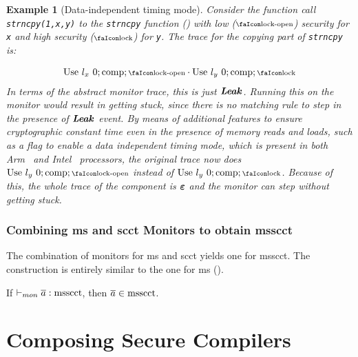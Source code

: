 \documentclass[dvipsnames]{llncs}
\newtheorem{exampleenv}{Example}[section]
\begin{document}
\begin{exampleenv}[Data-independent timing mode]\label{ex:ditm}
  Consider the function call \texttt{strncpy(1,x,y)} to the \texttt{strncpy} function () with low ($\unlock$) security for \texttt{x} and high security ($\lock$) for \texttt{y}.
  The trace for the copying part of \texttt{strncpy} is: 

\vspace{-1em}
  {\small
  \begin{align*}
  	\ev{Use}\ \loc_{x}\ 0;\comp;\unlock\cdot\ev{Use}\ \loc_{y}\ 0;\comp;\lock	
  \end{align*}
  }
  In terms of the abstract monitor trace, this is just $\bm{\mathit{Leak}}$.
  Running this on the monitor would result in getting stuck, since there is no matching rule to step in the presence of $\bm{\mathit{Leak}}$ event. %
  By means of additional features to ensure cryptographic constant time even in the presence of memory reads and loads, such as a flag to enable a data independent timing mode, which is present in both Arm~\cite[p.~543]{arm-refman} and Intel~\cite[p.~80]{intel-refman} processors, the original trace now does $\ev{Use}\ \loc_{y}\ 0;\comp;\unlock$ instead of $\ev{Use}\ \loc_{y}\ 0;\comp;\lock$.
  Because of this, the whole trace of the component is $\bm{\mathit{\varepsilon}}$ and the monitor can step without getting stuck.
\end{exampleenv}

\subsubsection{Combining \gls*{ms} and \gls*{scct} Monitors to obtain \gls*{msscct}}

The combination of monitors for \gls*{ms} and \gls*{scct} yields one for \gls*{msscct}.
The construction is entirely similar to the one for \gls*{ms} ().

\begin{lemma}\label{lem:mon:msscctsafe}
  If $\vdash_{mon}{\overline{a}}:{\operatorname{msscct}}$, then $\overline{a}\in\operatorname{msscct}$. %
\end{lemma}

\section{Composing Secure Compilers}\label{sec:compcomp}
\end{document}
